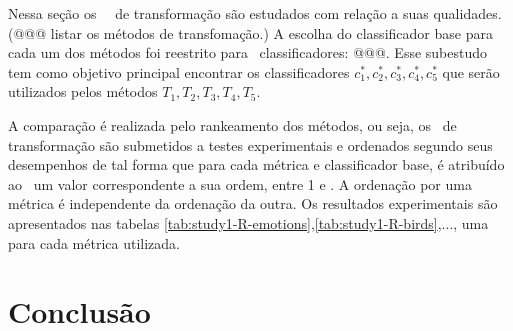 Nessa seção os \NmlT~\MMLs~de transformação são estudados com relação a suas qualidades. (@@@ listar os métodos de transfomação.)
A escolha do classificador base para cada um dos métodos foi reestrito para \Ncb~classificadores: @@@.
Esse subestudo tem como objetivo principal encontrar os classificadores $c_1^*,c_2^*,c_3^*,c_4^*,c_5^*$ que serão utilizados pelos
métodos $T_1,T_2,T_3,T_4,T_5$.

A comparação é realizada pelo rankeamento dos métodos, ou seja, os \MMLs~de transformação são submetidos a testes experimentais
e ordenados segundo seus desempenhos de tal forma que para cada métrica e classificador base,
é atribuído ao \MML~um valor correspondente a sua ordem, entre 1 e \NmlT. A ordenação por uma métrica
é independente da ordenação da outra. 
Os resultados experimentais são apresentados nas tabelas \ref{tab:study1-R-emotions},\ref{tab:study1-R-birds},..., uma para cada métrica utilizada.




\chapter{Conclusão}